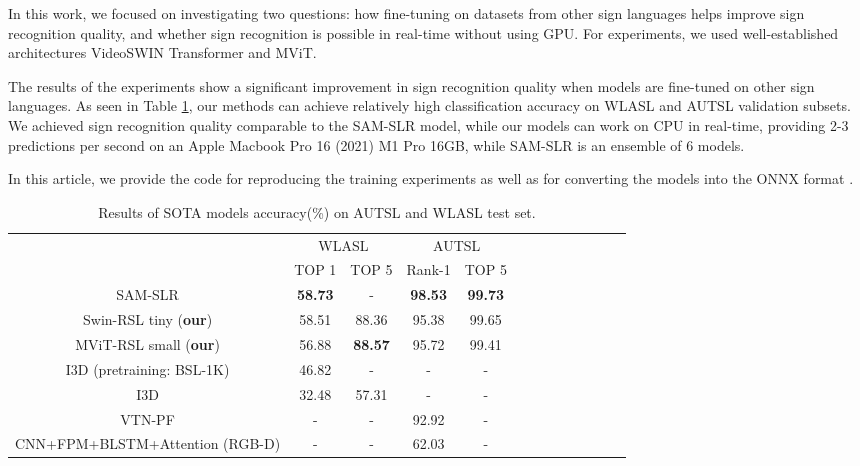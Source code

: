 \documentclass[]{spie}
\begin{document}
In this work, we focused on investigating two questions: how fine-tuning on datasets from other sign languages helps improve sign recognition quality, and whether sign recognition is possible in real-time without using GPU. For experiments, we used well-established architectures VideoSWIN Transformer and MViT. 

The results of the experiments show a significant improvement in sign recognition quality when models are fine-tuned on other sign languages. As seen in Table \ref{tab:extended-all-results-table}, our methods can achieve relatively high classification accuracy on WLASL and AUTSL validation subsets. We achieved sign recognition quality comparable to the SAM-SLR model, while our models can work on CPU in real-time, providing 2-3 predictions per second on an Apple Macbook Pro 16 (2021) M1 Pro 16GB, while SAM-SLR is an ensemble of 6 models.  

In this article, we provide the code for reproducing the training experiments as well as for converting the models into the ONNX format \cite{slr_rsl_github}.

\begin{table}[!ht]
\caption{\label{tab:extended-all-results-table} Results of SOTA models accuracy(\%) on AUTSL and WLASL test set.}
\begin{center}

\begin{tabular}{|c|c|c|c|c|c|c|c|c|c|c|c|c|}
\hline
\multirow{2}{*}{} & \multicolumn{2}{c|}{WLASL}&\multicolumn{2}{c|}{AUTSL} \\
\cline{2-5}
& TOP 1 & TOP 5  & Rank-1  & TOP 5\\
\hline
SAM-SLR\cite{Jiang2021} & \textbf{58.73} & - & \textbf{98.53} & \textbf{99.73} \\
Swin-RSL tiny (\textbf{our}) & 58.51 & 88.36  & 95.38 & 99.65 \\
MViT-RSL small (\textbf{our}) & 56.88 & \textbf{88.57} & 95.72 & 99.41 \\
I3D (pretraining: BSL-1K)\cite{Albanie2020}  & 46.82 & - & - & - \\
I3D\cite{Li2020}& 32.48 & 57.31 & - & - \\
VTN-PF\cite{DeCoster2021} & - & - & 92.92 & - \\
CNN+FPM+BLSTM+Attention (RGB-D)\cite{Sincan2020} & - & - & 62.03 & - \\
\hline
\end{tabular}
\end{center}
\end{table}










  
\end{document}
